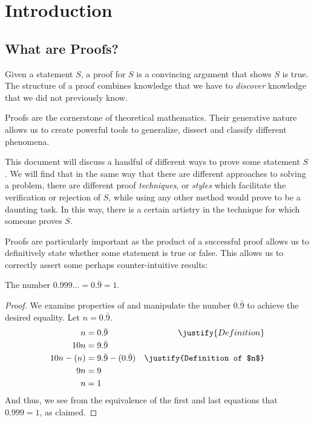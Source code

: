\chapter{Introduction}
\section{What are Proofs?}
Given a statement $S$, a proof for $S$ is a convincing argument that shows $S$ is true.
The structure of a proof combines knowledge that we have to \emph{discover} knowledge
that we did not previously know.

Proofs are the cornerstone of theoretical mathematics. Their generative nature
allows us to create powerful tools to generalize, dissect and classify different
phenomena.

This document will discuss a handful of different ways to prove some statement $S$.
We will find that in the same way that there are different approaches to solving a
problem, there are different proof \emph{techniques}, or \emph{styles} which
facilitate the verification or rejection of $S$, while using any other method would
prove to be a daunting task. In this way, there is a certain artistry in the
technique for which someone proves $S$.

Proofs are particularly important as the product of a successful proof allows us
to definitively state whether some statement is true or false. This allows us to correctly assert
some perhaps counter-intuitive results:
\begin{claim}
  The number $0.999... = 0.\bar{9} = 1$.
  \begin{proof}
    We examine properties of and manipulate the number $0.\bar{9}$ to achieve the desired
    equality. Let $n = 0.\bar{9}$.
    \begin{align}
       n  &= 0.\bar{9} & \justify{Definition}  \\
       10n &= 9.\bar{9}   											\\
       10n - (n) &= 9.\bar{9} - (0.\bar{9}) & \justify{Definition of $n$} \\
       9n &= 9 \\
        n &= 1
    \end{align}
    And thus, we see from the equivalence of the first and last equations that $0.999 = 1$, as claimed.
  \end{proof}
\end{claim}

